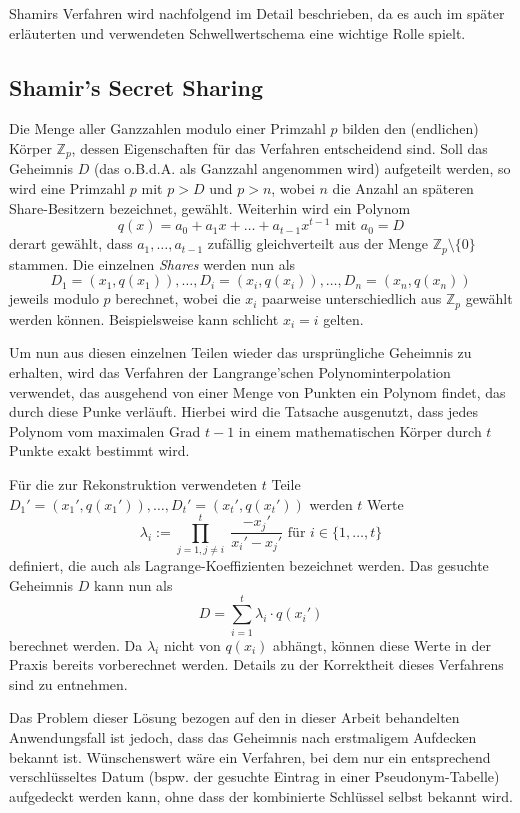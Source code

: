 Shamirs Verfahren wird nachfolgend im Detail beschrieben, da es auch im später erläuterten und verwendeten Schwellwertschema eine wichtige Rolle spielt.

\subsection{Shamir's Secret Sharing}

\label{sec_basics_threshold_shamir}

Die Menge aller Ganzzahlen modulo einer Primzahl \(p\) bilden den (endlichen) Körper \(\mathbb{Z}_p\), dessen Eigenschaften für das Verfahren entscheidend sind. Soll das Geheimnis \(D\) (das o.B.d.A. als Ganzzahl angenommen wird) aufgeteilt werden, so wird eine Primzahl \(p\) mit \(p > D\) und \(p > n\), wobei \(n\) die Anzahl an späteren Share-Besitzern bezeichnet, gewählt. Weiterhin wird ein Polynom 
\[q(x) = a_0 + a_1x + \dots + a_{t-1}x^{t-1} \text{ mit } a_0 = D\] 
derart gewählt, dass \(a_1, \dots, a_{t-1}\) zufällig gleichverteilt aus der Menge \(\mathbb{Z}_p \setminus \{0\}\) stammen. Die einzelnen \textit{Shares} werden nun als
\[D_1=(x_1,q(x_1)), \dots, D_i=(x_i,q(x_i)), \dots, D_n=(x_n,q(x_n))\]
jeweils modulo \(p\) berechnet, wobei die \(x_i\) paarweise unterschiedlich aus \(\mathbb{Z}_p\) gewählt werden können. Beispielsweise kann schlicht \(x_i = i\) gelten.

Um nun aus diesen einzelnen Teilen wieder das ursprüngliche Geheimnis zu erhalten, wird das Verfahren der Langrange'schen Polynominterpolation verwendet, das ausgehend von einer Menge von Punkten ein Polynom findet, das durch diese Punke verläuft. Hierbei wird die Tatsache ausgenutzt, dass jedes Polynom vom maximalen Grad \(t-1\) in einem mathematischen Körper durch \(t\) Punkte exakt bestimmt wird.

Für die zur Rekonstruktion verwendeten \(t\) Teile \(D_1'=(x_1',q(x_1')),\dots,D_t'=(x_t',q(x_t'))\) werden \(t\) Werte 
\[\lambda_i := \prod_{j=1, j \not= i}^{t} \; \frac{- x_j'}{x_i' - x_j'} \text{ für } i \in \{1,\dots,t\}\] 
definiert, die auch als Lagrange-Koeffizienten bezeichnet werden. Das gesuchte Geheimnis \(D\) kann nun als
\[D = \sum_{i=1}^{t}\lambda_i \cdot q(x_i')\]
berechnet werden. Da \(\lambda_i\) nicht von \(q(x_i)\) abhängt, können diese Werte in der Praxis bereits vorberechnet werden. Details zu der Korrektheit dieses Verfahrens sind \cite{boneh2016} zu entnehmen.

Das Problem dieser Lösung bezogen auf den in dieser Arbeit behandelten Anwendungsfall ist jedoch, dass das Geheimnis nach erstmaligem Aufdecken bekannt ist. Wünschenswert wäre ein Verfahren, bei dem nur ein entsprechend verschlüsseltes Datum (bspw. der gesuchte Eintrag in einer Pseudonym-Tabelle) aufgedeckt werden kann, ohne dass der kombinierte Schlüssel selbst bekannt wird. 

